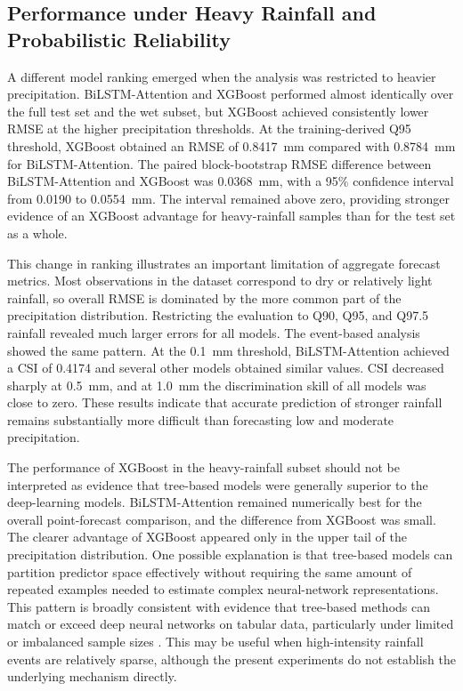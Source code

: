\documentclass[referee,pdflatex,sn-basic]{sn-jnl}%
\theoremstyle{thmstyleone}%
\theoremstyle{thmstyletwo}%
\theoremstyle{thmstylethree}%
\begin{document}
\subsection{Performance under Heavy Rainfall and Probabilistic Reliability}

A different model ranking emerged when the analysis was restricted to heavier precipitation. BiLSTM-Attention and XGBoost performed almost identically over the full test set and the wet subset, but XGBoost achieved consistently lower RMSE at the higher precipitation thresholds. At the training-derived Q95 threshold, XGBoost obtained an RMSE of 0.8417~mm compared with 0.8784~mm for BiLSTM-Attention. The paired block-bootstrap RMSE difference between BiLSTM-Attention and XGBoost was 0.0368~mm, with a 95\% confidence interval from 0.0190 to 0.0554~mm. The interval remained above zero, providing stronger evidence of an XGBoost advantage for heavy-rainfall samples than for the test set as a whole.

This change in ranking illustrates an important limitation of aggregate forecast metrics. Most observations in the dataset correspond to dry or relatively light rainfall, so overall RMSE is dominated by the more common part of the precipitation distribution. Restricting the evaluation to Q90, Q95, and Q97.5 rainfall revealed much larger errors for all models. The event-based analysis showed the same pattern. At the 0.1~mm threshold, BiLSTM-Attention achieved a CSI of 0.4174 and several other models obtained similar values. CSI decreased sharply at 0.5~mm, and at 1.0~mm the discrimination skill of all models was close to zero. These results indicate that accurate prediction of stronger rainfall remains substantially more difficult than forecasting low and moderate precipitation.

The performance of XGBoost in the heavy-rainfall subset should not be interpreted as evidence that tree-based models were generally superior to the deep-learning models. BiLSTM-Attention remained numerically best for the overall point-forecast comparison, and the difference from XGBoost was small. The clearer advantage of XGBoost appeared only in the upper tail of the precipitation distribution. One possible explanation is that tree-based models can partition predictor space effectively without requiring the same amount of repeated examples needed to estimate complex neural-network representations. This pattern is broadly consistent with evidence that tree-based methods can match or exceed deep neural networks on tabular data, particularly under limited or imbalanced sample sizes \citep{grinsztajn2022tree}. This may be useful when high-intensity rainfall events are relatively sparse, although the present experiments do not establish the underlying mechanism directly.
\end{document}
